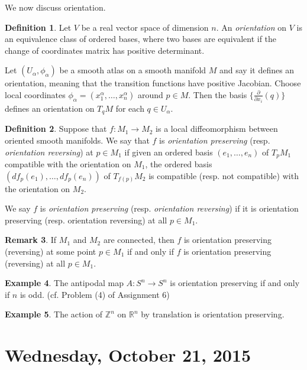 \documentclass{amsart}
\numberwithin{equation}{section}
\newcommand{\bR}{\mathbb{R}}
\newcommand{\bZ}{\mathbb{Z}}
\theoremstyle{definition}
\newtheorem{definition}{Definition} [section]
\newtheorem{example}[definition]{Example}
\newtheorem{remark}[definition]{Remark}
\theoremstyle{theorem}
\begin{document}
We now discuss orientation. 

\begin{definition}
Let $V$ be a real vector space of dimension $n$. An {\em orientation} on $V$ is an equivalence class of ordered bases, where two bases are equivalent if the change of coordinates matrix has positive determinant. 
\end{definition}

Let $(U_\alpha, \phi_\alpha)$ be a smooth atlas on a smooth manifold $M$ and say it defines an orientation, meaning that the 
transition functions have positive Jacobian. Choose local coordinates $\phi_\alpha = (x_1^\alpha, \ldots, x_n^\alpha)$ around 
$p \in M$. Then the basis $\{\frac{\partial}{\partial x_i}(q)\}$ defines an orientation on $T_qM$ for each $q \in U_\alpha$. 

\begin{definition}
Suppose that $f : M_1 \to M_2$ is a local diffeomorphism between oriented smooth manifolds. We say that $f$ is {\em orientation preserving}
(resp. {\em orientation reversing}) at 
$p \in M_1$ if given an ordered basis $(e_1, \ldots, e_n)$ of $T_pM_1$ compatible with the orientation on $M_1$, the ordered basis 
$(df_p(e_1), \ldots, df_p(e_n))$ of $T_{f(p)}M_2$ is compatible (resp. not compatible) with the orientation on $M_2$. 

We say $f$ is {\em orientation preserving} (resp. {\em orientation reversing}) if it is orientation preserving
(resp. orientation reversing) at all $p\in M_1$.
\end{definition}

\begin{remark}
If $M_1$ and $M_2$ are connected, then $f$ is orientation preserving (reversing) at some point $p \in M_1$ if and only if $f$ is orientation preserving (reversing) at all $p \in M_1$. 
\end{remark}

\begin{example}
The antipodal map $A : S^n \to S^n$ is orientation preserving if and only if $n$ is odd. (cf. Problem (4) of Assignment 6)
\end{example}

\begin{example}
The action of $\bZ^n$ on $\bR^n$ by translation is orientation preserving. 
\end{example}


\section{Wednesday, October 21, 2015}
\end{document}
